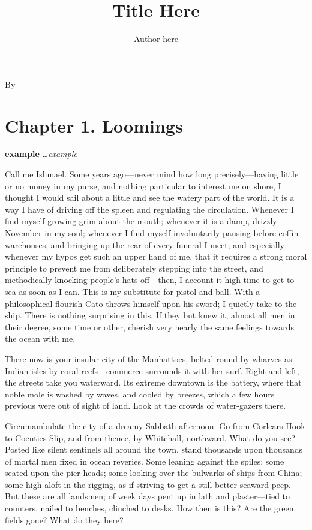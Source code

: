 \documentclass[12pt,ebook,oneside,openany]{memoir} %
\author{Author here}
\title{Title Here}
\makeatletter
\def\maketitle{%
  \null
  \thispagestyle{empty}%
  \vfill
  \begin{center}\leavevmode
    \normalfont
    {\Huge\@title\par}%
    \hrulefill\par
    \vskip 3cm
    {\Huge By \@author\par}%
  \end{center}%
  \vfill
  \null
  \cleardoublepage
  }
\makeatother
\begin{document}
\maketitle

\begin{KeepFromToc}
  {\small\tableofcontents*}
\end{KeepFromToc}

\mainmatter

\chapter{Chapter 1. Loomings}

\textbf{example} \ldots \textit{example}

Call me Ishmael. Some years ago—never mind how long precisely—having little or no money in my purse, and nothing particular to interest me on shore, I thought I would sail about a little and see the watery part of the world. It is a way I have of driving off the spleen and regulating the circulation. Whenever I find myself growing grim about the mouth; whenever it is a damp, drizzly November in my soul; whenever I find myself involuntarily pausing before coffin warehouses, and bringing up the rear of every funeral I meet; and especially whenever my hypos get such an upper hand of me, that it requires a strong moral principle to prevent me from deliberately stepping into the street, and methodically knocking people’s hats off—then, I account it high time to get to sea as soon as I can. This is my substitute for pistol and ball. With a philosophical flourish Cato throws himself upon his sword; I quietly take to the ship. There is nothing surprising in this. If they but knew it, almost all men in their degree, some time or other, cherish very nearly the same feelings towards the ocean with me.

There now is your insular city of the Manhattoes, belted round by wharves as Indian isles by coral reefs—commerce surrounds it with her surf. Right and left, the streets take you waterward. Its extreme downtown is the battery, where that noble mole is washed by waves, and cooled by breezes, which a few hours previous were out of sight of land. Look at the crowds of water-gazers there.

Circumambulate the city of a dreamy Sabbath afternoon. Go from Corlears Hook to Coenties Slip, and from thence, by Whitehall, northward. What do you see?—Posted like silent sentinels all around the town, stand thousands upon thousands of mortal men fixed in ocean reveries. Some leaning against the spiles; some seated upon the pier-heads; some looking over the bulwarks of ships from China; some high aloft in the rigging, as if striving to get a still better seaward peep. But these are all landsmen; of week days pent up in lath and plaster—tied to counters, nailed to benches, clinched to desks. How then is this? Are the green fields gone? What do they here?
\end{document}
